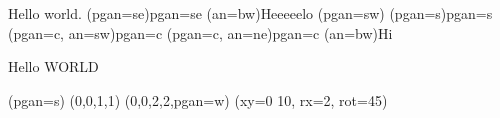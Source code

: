 \documentclass{corpboreport+}
\begin{document}
  Hello world.%
  \olay(pgan=se){\Large pgan=se} %
  \olay(an=bw){Heeeeelo}
  \olayxfm(pgan=sw)
  \olay(pgan=s){\Large pgan=s} %
  \olay(pgan=c, an=sw){\Large pgan=c} %
  \olay(pgan=c, an=ne){\Large pgan=c} %
  \olayxfm\olay(an=bw){Hi}

  Hello WORLD
  
  \olayxfm(pgan=s)
  \olaygrid
  \olaybox(0,0,1,1)
  \olaybox(0,0,2,2,pgan=w)
  \olaycirc(xy=0 10, rx=2, rot=45)
  
\end{document}

